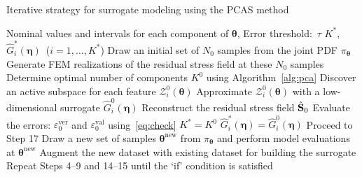 \begin{breakablealgorithm}
\renewcommand{\algorithmicrequire}{\textbf{Input:}}
\renewcommand{\algorithmicensure}{\textbf{Output:}}
  \caption{Iterative strategy for surrogate modeling using the PCAS method}
  \begin{algorithmic}[1]
  \Require Nominal values and intervals for each component of $\bm{\theta}$, Error threshold:~$\tau$
  \Ensure $K^\ast$, $\hat{G}_i^\ast(\bm{\eta})$~($i=1,\ldots,K^\ast$)
    \State Draw an initial set of $N_0$ samples from the joint PDF $\pi_{\bm{\theta}}$
    \State Generate FEM realizations of the residual stress field at these $N_0$ samples
    \State Determine optimal number of components $K^0$ using Algorithm~\ref{alg:pca}
    \State Discover an active subspace for each feature $\mathcal{Z}_i^0(\bm{\theta})$
    \State Approximate $\mathcal{Z}_i^0(\bm{\theta})$ with a low-dimensional surrogate $\hat{G}_i^0(\bm{\eta})$ 
    \State Reconstruct the residual stress field $\hat{\mathbf{{S}}}_0$
    \State Evaluate the errors: $\varepsilon_0^{\text{ver}}$ and $\varepsilon_0^{\text{val}}$ using~\eqref{eq:check}
    \State $K^\ast=K^0$
    \State $\hat{G}_i^\ast(\bm{\eta})=\hat{G}_i^0(\bm{\eta})$
    \State Proceed to Step 17
    \EndIf
    \State Draw a new set of samples $\bm{\theta}^{\text{new}}$ from $\pi_{\bm{\theta}}$ and 
    perform model evaluations at $\bm{\theta}^{\text{new}}$
    \State Augment the new dataset with existing dataset for building the surrogate
    \State Repeat Steps 4--9 and 14--15 until the `if' condition is satisfied
  \EndProcedure
  \end{algorithmic}
  \label{alg:pcas}
\end{breakablealgorithm} 

